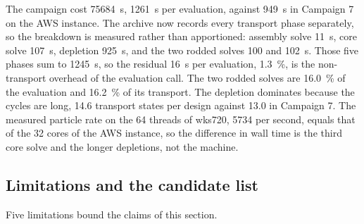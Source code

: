 The campaign cost \SI{75684}{s}, \SI{1261}{s} per evaluation, against
\SI{949}{s} in Campaign 7 on the AWS instance. The archive now records
every transport phase separately, so the breakdown is measured rather
than apportioned: assembly solve \SI{11}{s}, core solve \SI{107}{s},
depletion \SI{925}{s}, and the two rodded solves \num{100} and
\SI{102}{s}. Those five phases sum to \SI{1245}{s}, so the residual
\SI{16}{s} per evaluation, \SI{1.3}{\%}, is the non-transport
overhead of the evaluation call. The two rodded solves are
\SI{16.0}{\%} of the evaluation and \SI{16.2}{\%} of its transport. The depletion dominates because the cycles are long, 14.6
transport states per design against 13.0 in Campaign 7. The measured
particle rate on the 64 threads of wks720, \num{5734} per second,
equals that of the 32 cores of the AWS instance, so the difference in
wall time is the third core solve and the longer depletions, not the
machine.

\subsection{Limitations and the candidate list}
\label{sec:res-c8-limits}

Five limitations bound the claims of this section.

